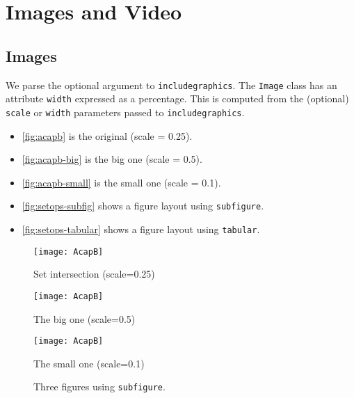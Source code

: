 
\chapter{Images and Video}

\section{Images}

We parse the optional argument to \texttt{includegraphics}. The \texttt{Image} class has an attribute \texttt{width} expressed as a percentage. This is computed from the (optional) \texttt{scale} or \texttt{width} parameters passed to \texttt{includegraphics}.

\begin{itemize}
\item \autoref{fig:acapb} is the original (scale = 0.25).
\item \autoref{fig:acapb-big} is the big one (scale = 0.5).
\item \autoref{fig:acapb-small} is the small one (scale = 0.1).
\item \autoref{fig:setops-subfig} shows a figure layout using \texttt{subfigure}.
\item \autoref{fig:setops-tabular} shows a figure layout using \texttt{tabular}. %
\end{itemize}

\begin{figure}[ht]
\centering
\texttt{[image: AcapB]}
\caption{Set intersection (scale=0.25)\label{fig:acapb}}
\end{figure}

\begin{figure}[ht]
\centering
\texttt{[image: AcapB]}
\caption{The big one (scale=0.5)\label{fig:acapb-big}}
\end{figure}

\begin{figure}[ht]
\centering
\texttt{[image: AcapB]}
\caption{The small one (scale=0.1)\label{fig:acapb-small}}
\end{figure}

\begin{figure}[htb]
\centering
{}
\caption{Three figures using \texttt{subfigure}.\label{fig:setops-subfig}}
\end{figure}

